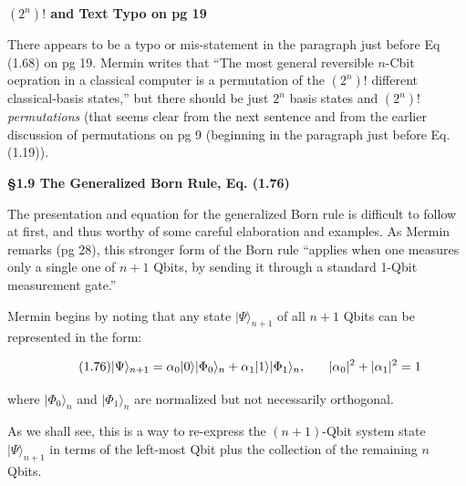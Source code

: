 \documentclass{article}
\begin{document}

\vspace{0.25in}

\textbf{\large $(2^n)!$ and Text Typo on pg 19}\par

\vspace{0.25in}

There appears to be a typo or mis-statement in the paragraph just before Eq (1.68) on pg 19. Mermin writes that ``The most general reversible $n$-Cbit oepration in a classical computer is a permutation of the $(2^n)!$ different classical-basis states,'' but there should be just $2^n$ basis states and $(2^n)!$ \textit{permutations} (that seems clear from the next sentence and from the earlier discussion of permutations on pg 9 (beginning in the paragraph just before Eq. (1.19)).


\vspace{0.25in}

\textbf{\large \S1.9 The Generalized Born Rule, Eq. (1.76)}\par

\vspace{0.25in}

The presentation and equation for the generalized Born rule is difficult to follow at first, and thus worthy  of some careful elaboration and examples. As Mermin remarks (pg 28), this stronger form of the Born rule ``applies when one measures only a single one of $n+1$ Qbits, by sending it through a standard 1-Qbit measurement gate.''

Mermin begins by noting that any state $|\Psi\rangle_{n+1}$ of all $n+1$ Qbits can be represented in the form:

\[\tag{1.76}
|\Psi\rangle_{n+1} =
  \alpha_0 |0\rangle |\Phi_0\rangle_n
  + \alpha_1 |1\rangle |\Phi_1\rangle_n,
  \hspace{0.25in}|\alpha_0|^2 + |\alpha_1|^2 = 1
\]

where $|\Phi_0\rangle_n$ and $|\Phi_1\rangle_n$ are normalized but not necessarily orthogonal.

\vspace{0.125in}

As we shall see, this is a way to re-express the $(n+1)$-Qbit system state $|\Psi\rangle_{n+1}$ in terms of the left-most Qbit plus the collection of the remaining $n$ Qbits.
\end{document}
